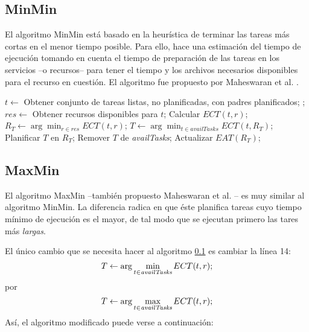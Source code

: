 \subsection{MinMin}
\label{alg:min-min}
El algoritmo MinMin está basado en la heurística de terminar las tareas más cortas en el menor tiempo posible. Para ello, hace una estimación del tiempo de ejecución tomando en cuenta el tiempo de preparación de las tareas en los servicios --o recursos-- para tener el tiempo y los archivos necesarios disponibles para el recurso en cuestión. El algoritmo fue propuesto por Maheswaran et al. \cite{maheswaran1999dynamic}. 

\begin{algorithmic}[1]
	\State $t \gets$ Obtener conjunto de tareas listas, no planificadas, con padres planificados;
	\State {};
\EndWhile
{}
			\State $res \gets$ Obtener recursos disponibles para $t$;
				\State Calcular $ECT(t,r)$;
			\EndFor
			\State $R_T \gets \arg\min_{r \in res}ECT(t,r)$;
		\EndFor
		\State $T \gets \arg\min_{t \in availTasks}ECT(t,R_T)$;
		\State Planificar $T$ en $R_T$;
		\State Remover $T$ de \emph{availTasks};
		\State Actualizar $EAT(R_T)$;
	\EndWhile
\EndProcedure
\end{algorithmic}

\subsection{MaxMin}
\label{alg:max-min}
El algoritmo MaxMin --también propuesto Maheswaran et al. \cite{maheswaran1999dynamic}-- es muy similar al algoritmo MinMin. La diferencia radica en que éste planifica tareas cuyo tiempo mínimo de ejecución es el mayor, de tal modo que se ejecutan primero las tares más \emph{largas}.

El único cambio que se necesita hacer al algoritmo \ref{alg:min-min} es cambiar la línea 14:
\[T \leftarrow \arg\min_{t \in \emph{availTasks}}ECT(t,r);\]
por
\[T \leftarrow \arg\max_{t \in \emph{availTasks}}ECT(t,r);\]
Así, el algoritmo modificado puede verse a continuación: %

